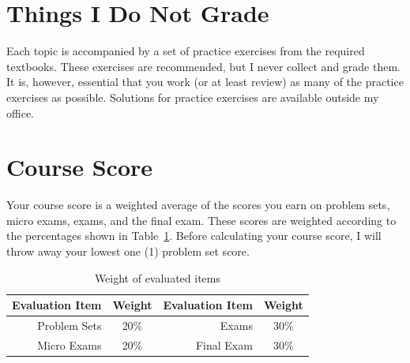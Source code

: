 \documentclass[letterpaper,oneside,onecolumn,11pt,article]{memoir}
\begin{document}
\section{Things I Do Not Grade}
Each topic is accompanied by a set of practice exercises from the required textbooks. These exercises are recommended, but I never collect and grade them. It is, however, essential that you work (or at least review) as many of the practice exercises as possible. Solutions for practice exercises are available outside my office. 
%
%
\section{Course Score}
Your course score is a weighted average of the scores you earn on problem sets, micro exams, exams, and the final exam. These scores are weighted according to the percentages shown in Table~\ref{tab:weights}. Before calculating your course score, I will throw away your lowest one (1) problem set score. 
%
%
\renewcommand{\arraystretch}{1.15}
\begin{table}[h]
\caption{\sffamily Weight of evaluated items}
\label{tab:weights}
\begin{tabular}{rc|rc}
\hline\hline
\textbf{Evaluation Item} & \textbf{Weight} & \textbf{Evaluation Item} & \textbf{Weight} \\ \hline
Problem Sets & 20\% & Exams & 30\% \\
Micro Exams & 20\% & Final Exam & 30\% \\
\hline\hline
\end{tabular}
\end{table}
%
%
\end{document}
